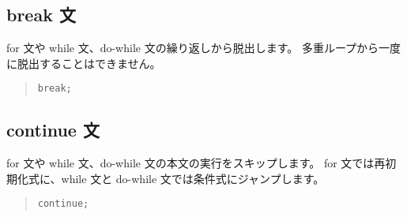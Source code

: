\subsection{break 文}

for 文や while 文、do-while 文の繰り返しから脱出します。
多重ループから一度に脱出することはできません。

\begin{quote}
\begin{verbatim}
break;
\end{verbatim}
\end{quote}

\subsection{continue 文}

for 文や while 文、do-while 文の本文の実行をスキップします。
for 文では再初期化式に、while 文と do-while 文では条件式にジャンプします。

\begin{quote}
\begin{verbatim}
continue;
\end{verbatim}
\end{quote}
